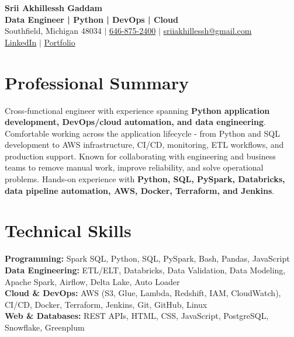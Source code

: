 \documentclass[letterpaper,10pt]{article}
\begin{document}
\fontsize{9.35pt}{10.45pt}\selectfont

\begin{center}
    {\LARGE \textbf{Srii Akhillessh Gaddam}} \\[-1pt]
    \textbf{Data Engineer | Python | DevOps | Cloud} \\[2pt]
    Southfield, Michigan 48034 $|$
    \href{tel:6468752400}{646-875-2400} $|$
    \href{mailto:sriiakhillessh@gmail.com}{sriiakhillessh@gmail.com} \\[1pt]
    \href{https://www.linkedin.com/in/srii-akhiilessh-gaddam-b48668191/}{LinkedIn} $|$
    \href{https://sriiakhillesshg.github.io/portfolio/}{Portfolio}
\end{center}
\vspace{-8pt}

\section{Professional Summary}
\small{Cross-functional engineer with experience spanning \textbf{Python application development, DevOps/cloud automation, and data engineering}. Comfortable working across the application lifecycle - from Python and SQL development to AWS infrastructure, CI/CD, monitoring, ETL workflows, and production support. Known for collaborating with engineering and business teams to remove manual work, improve reliability, and solve operational problems. Hands-on experience with \textbf{Python, SQL, PySpark, Databricks, data pipeline automation, AWS, Docker, Terraform, and Jenkins}.}

\section{Technical Skills}
\small{
\textbf{Programming:} Spark SQL, Python, SQL, PySpark, Bash, Pandas, JavaScript \\
\textbf{Data Engineering:} ETL/ELT, Databricks, Data Validation, Data Modeling, Apache Spark, Airflow, Delta Lake, Auto Loader \\
\textbf{Cloud \& DevOps:} AWS (S3, Glue, Lambda, Redshift, IAM, CloudWatch), CI/CD, Docker, Terraform, Jenkins, Git, GitHub, Linux \\
\textbf{Web \& Databases:} REST APIs, HTML, CSS, JavaScript, PostgreSQL, Snowflake, Greenplum
}

\end{document}
